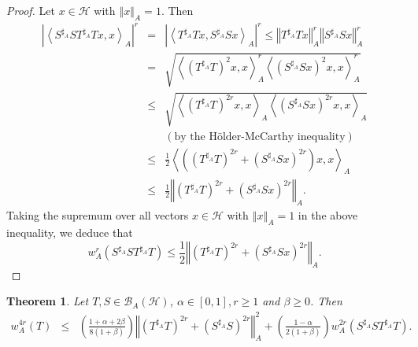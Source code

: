 \documentclass{article}
\newcommand{\bra}[1]{\left(#1\right)}
\newcommand{\seqA}[1]{{\left<#1\right>}_{A}}
\newcommand{\normA}[1]{{\left\Vert#1\right\Vert}_{A}}
\newcommand{\abs}[1]{\left\vert#1\right\vert}
\newcommand {\Sa}{S^{\sharp_{A}}}
\newcommand {\h}{\mathcal{H}}
\newcommand {\Ta}{T^{\sharp_{A}}}
\renewcommand {\b}{\mathcal{B}}
\newtheorem{theorem}{Theorem}[section]
\begin{document}
\begin{proof} Let $x\in\h$ with $\normA{x}=1$. Then
\begin{eqnarray*}
  \abs{\seqA{\Sa S\Ta Tx,x}}^{r} &=& \abs{\seqA{\Ta Tx,\Sa Sx}}^{r}\leq \normA{\Ta Tx}^{r}\normA{\Sa Sx}^{r} \\
   &=&\sqrt{\seqA{\bra{\Ta T}^2x,x}^{r}\seqA{\bra{\Sa Sx}^{2}x,x}^{r}}\\
   &\leq& \sqrt{\seqA{\bra{\Ta T}^{2r}x,x}\seqA{\bra{\Sa Sx}^{2r}x,x}}\\
   &&\bra{\mbox{by the H\"older-McCarthy inequality}}\\
   &\leq& \frac{1}{2}\seqA{\bra{\bra{\Ta T}^{2r}+\bra{\Sa Sx}^{2r}}x,x} \\
   &\leq& \frac{1}{2}\normA{\bra{\Ta T}^{2r}+\bra{\Sa Sx}^{2r}}.
\end{eqnarray*}
Taking the supremum over all vectors $x\in\h$ with $\normA{x}=1$ in the above inequality, we deduce that
$$ w_A^{r}(\Sa S\Ta T)\leq \frac{1}{2}\normA{\bra{\Ta T}^{2r}+\bra{\Sa Sx}^{2r}}.$$
\end{proof}
\begin{theorem}\label{Rahma1}
  Let $T,S\in\b_A(\h)$, $\alpha\in [0,1],r\geq 1$ and $\beta\geq 0$. Then
\begin{eqnarray*}
  w_A^{4r} (T)&\leq& \bra{\frac{1+\alpha+2\beta}{8(1+\beta)}}\normA{\bra{\Ta T}^{2r}+\bra{\Sa S}^{2r}}^2+\bra{\frac{1-\alpha}{2(1+\beta)}}w_A^{2r}(\Sa S\Ta T).
\end{eqnarray*}
\end{theorem}
\end{document}
